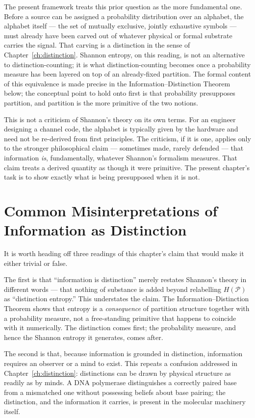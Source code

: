 \documentclass[12pt,twoside,openright]{book}
\newcommand{\partition}{\mathcal{P}}
\begin{document}
The present framework treats this prior question as the more
fundamental one. Before a source can be assigned a probability
distribution over an alphabet, the alphabet itself --- the set
of mutually exclusive, jointly exhaustive symbols --- must
already have been carved out of whatever physical or formal
substrate carries the signal. That carving is a distinction in
the sense of Chapter~\ref{ch:distinction}. Shannon entropy, on
this reading, is not an alternative to distinction-counting; it
is what distinction-counting becomes once a probability measure
has been layered on top of an already-fixed partition. The
formal content of this equivalence is made precise in the
Information--Distinction Theorem below; the conceptual point to
hold onto first is that probability presupposes partition, and
partition is the more primitive of the two notions.

This is not a criticism of Shannon's theory on its own terms.
For an engineer designing a channel code, the alphabet is
typically given by the hardware and need not be re-derived from
first principles. The criticism, if it is one, applies only to
the stronger philosophical claim --- sometimes made, rarely
defended --- that information \emph{is}, fundamentally,
whatever Shannon's formalism measures. That claim treats a
derived quantity as though it were primitive. The present
chapter's task is to show exactly what is being presupposed
when it is not.

\section{Common Misinterpretations of Information as
  Distinction}
\label{sec:ch2-misinterpretations}

It is worth heading off three readings of this chapter's claim
that would make it either trivial or false.

The first is that ``information is distinction'' merely
restates Shannon's theory in different words --- that nothing
of substance is added beyond relabelling $H(\partition)$ as
``distinction entropy.'' This understates the claim. The
Information--Distinction Theorem shows that entropy is a
\emph{consequence} of partition structure together with a
probability measure, not a free-standing primitive that happens
to coincide with it numerically. The distinction comes first;
the probability measure, and hence the Shannon entropy it
generates, comes after.

The second is that, because information is grounded in
distinction, information requires an observer or a mind to
exist. This repeats a confusion addressed in
Chapter~\ref{ch:distinction}: distinctions can be drawn by
physical structure as readily as by minds. A DNA polymerase
distinguishes a correctly paired base from a mismatched one
without possessing beliefs about base pairing; the distinction,
and the information it carries, is present in the molecular
machinery itself.
\end{document}

